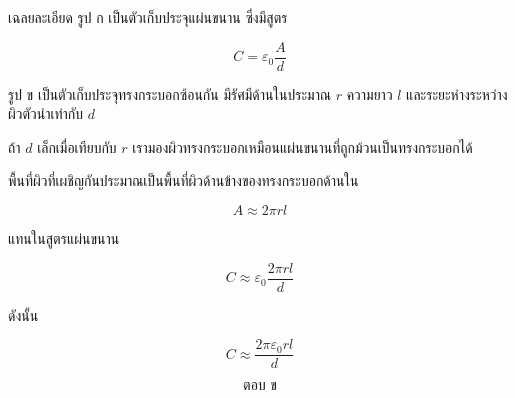 \begin{examplebox}{เฉลยละเอียด}
รูป ก เป็นตัวเก็บประจุแผ่นขนาน ซึ่งมีสูตร

\[
C=\varepsilon_0\frac{A}{d}
\]

รูป ข เป็นตัวเก็บประจุทรงกระบอกซ้อนกัน มีรัศมีด้านในประมาณ $r$ ความยาว $l$ และระยะห่างระหว่างผิวตัวนำเท่ากับ $d$

ถ้า $d$ เล็กเมื่อเทียบกับ $r$ เรามองผิวทรงกระบอกเหมือนแผ่นขนานที่ถูกม้วนเป็นทรงกระบอกได้

พื้นที่ผิวที่เผชิญกันประมาณเป็นพื้นที่ผิวด้านข้างของทรงกระบอกด้านใน

\[
A\approx 2\pi r l
\]

แทนในสูตรแผ่นขนาน


\[
C\approx \varepsilon_0\frac{2\pi rl}{d}
\]

ดังนั้น

\[
\boxed{C\approx \frac{2\pi\varepsilon_0rl}{d}}
\]

\[
\boxed{\text{ตอบ ข}}
\]
\end{examplebox}


